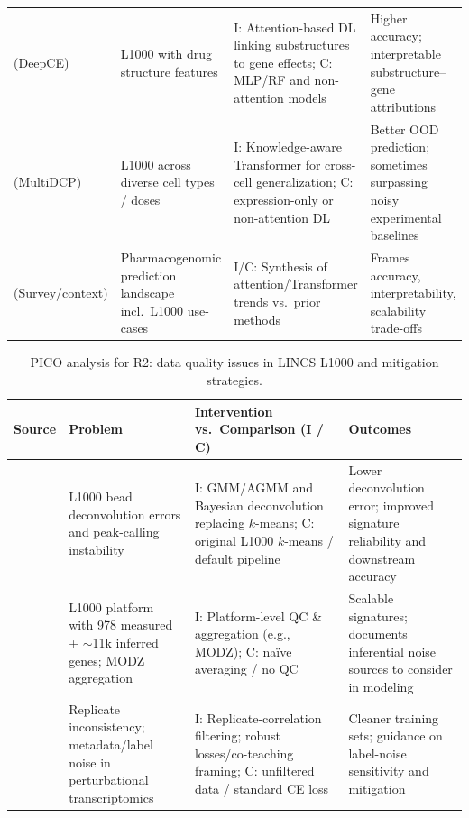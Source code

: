 \documentclass[twocolumn]{article}
\begin{document}
{\begin{table}[t]
\begin{tabular}{p{3.1cm} p{4.8cm} p{5.1cm} p{3.3cm}}
    \cite{pham2021deep} (DeepCE) &
    L1000 with drug structure features &
    I\@: Attention-based DL linking substructures to gene effects; 
    C\@: MLP/RF and non-attention models &
    Higher accuracy; interpretable substructure–gene attributions \\
    [0.35em]

    \cite{wu2022deep} (MultiDCP) &
    L1000 across diverse cell types / doses &
    I\@: Knowledge-aware Transformer for cross-cell generalization; 
    C\@: expression-only or non-attention DL &
    Better OOD prediction; sometimes surpassing noisy experimental baselines \\
    [0.35em]

    \cite{chow2022predicting} (Survey/context) &
    Pharmacogenomic prediction landscape incl.\ L1000 use-cases &
    I/C\@: Synthesis of attention/Transformer trends vs.\ prior methods &
    Frames accuracy, interpretability, scalability trade-offs \\
    \bottomrule
  \end{tabular}
\end{table}

\begin{table}[t]
  \centering
  \caption{PICO analysis for R2: data quality issues in LINCS L1000 and mitigation strategies.}
  \begin{tabular}{p{3.1cm} p{4.8cm} p{5.8cm} p{3.3cm}}
    \toprule
    \textbf{Source} & \textbf{Problem} & \textbf{Intervention vs.\ Comparison (I / C)} & \textbf{Outcomes} \\
    \midrule
    \cite{qiu2020bayesian} &
    L1000 bead deconvolution errors and peak-calling instability &
    I\@: GMM/AGMM and Bayesian deconvolution replacing $k$-means; C\@: original L1000 $k$-means / default pipeline &
    Lower deconvolution error; improved signature reliability and downstream accuracy \\[0.35em]

    \cite{subramanian2017next} &
    L1000 platform with 978 measured + $\sim$11k inferred genes; MODZ aggregation &
    I\@: Platform-level QC \& aggregation (e.g., MODZ); 
    C\@: naïve averaging / no QC &
    Scalable signatures; documents inferential noise sources to consider in modeling \\[0.35em]

    \cite{szalai2019signatures} &
    Replicate inconsistency; metadata/label noise in perturbational transcriptomics &
    I\@: Replicate-correlation filtering; robust losses/co-teaching framing; 
    C\@: unfiltered data / standard CE loss &
    Cleaner training sets; guidance on label-noise sensitivity and mitigation \\[0.35em]


\end{tabular}
\end{table}}
\end{document}
